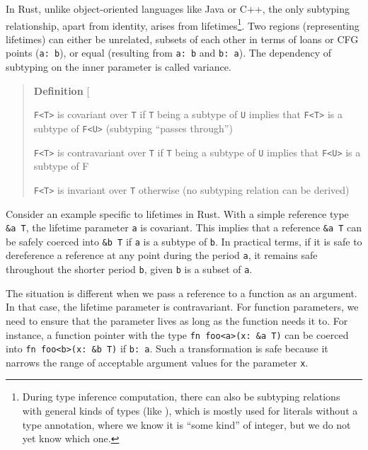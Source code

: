 \documentclass[
  11pt,
  twoside]{report}
\begin{document}
In Rust, unlike object-oriented languages like Java or C++, the only
subtyping relationship, apart from identity, arises from
lifetimes\footnote{During type inference computation, there can also be
  subtyping relations with general kinds of types (like ), which is
  mostly used for literals without a type annotation, where we know it
  is ``some kind'' of integer, but we do not yet know which one.}. Two
regions (representing lifetimes) can either be unrelated, subsets of
each other in terms of loans or CFG points
(\texttt{\textquotesingle{}a:\ \textquotesingle{}b}), or equal
(resulting from \texttt{\textquotesingle{}a:\ \textquotesingle{}b} and
\texttt{\textquotesingle{}b:\ \textquotesingle{}a}). The dependency of
subtyping on the inner parameter is called variance.

\begin{quote}
\textbf{Definition} {[}\citeproc{ref-reference}{14}{]}

\texttt{F\textless{}T\textgreater{}} is covariant over \texttt{T} if
\texttt{T} being a subtype of \texttt{U} implies that
\texttt{F\textless{}T\textgreater{}} is a subtype of
\texttt{F\textless{}U\textgreater{}} (subtyping ``passes through'')

\texttt{F\textless{}T\textgreater{}} is contravariant over \texttt{T} if
\texttt{T} being a subtype of \texttt{U} implies that
\texttt{F\textless{}U\textgreater{}} is a subtype of F

\texttt{F\textless{}T\textgreater{}} is invariant over \texttt{T}
otherwise (no subtyping relation can be derived)
\end{quote}

Consider an example specific to lifetimes in Rust. With a simple
reference type \texttt{\&\textquotesingle{}a\ T}, the lifetime parameter
\texttt{\textquotesingle{}a} is covariant. This implies that a reference
\texttt{\&\textquotesingle{}a\ T} can be safely coerced into
\texttt{\&\textquotesingle{}b\ T} if \texttt{\textquotesingle{}a} is a
subtype of \texttt{\textquotesingle{}b}. In practical terms, if it is
safe to dereference a reference at any point during the period
\texttt{\textquotesingle{}a}, it remains safe throughout the shorter
period \texttt{\textquotesingle{}b}, given \texttt{\textquotesingle{}b}
is a subset of \texttt{\textquotesingle{}a}.

The situation is different when we pass a reference to a function as an
argument. In that case, the lifetime parameter is contravariant. For
function parameters, we need to ensure that the parameter lives as long
as the function needs it to. For instance, a function pointer with the
type
\texttt{fn\ foo\textless{}\textquotesingle{}a\textgreater{}(x:\ \&\textquotesingle{}a\ T)}
can be coerced into
\texttt{fn\ foo\textless{}\textquotesingle{}b\textgreater{}(x:\ \&\textquotesingle{}b\ T)}
if \texttt{\textquotesingle{}b:\ \textquotesingle{}a}. Such a
transformation is safe because it narrows the range of acceptable
argument values for the parameter \texttt{x}.
\end{document}
